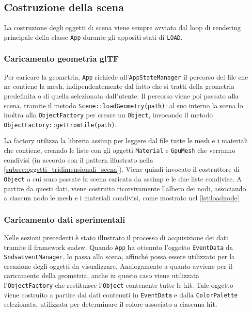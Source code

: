 \subsection{Costruzione della scena}
La costruzione degli oggetti di scena viene sempre avviata dal loop di rendering principale della classe \texttt{App} durante gli appositi stati di \texttt{LOAD}.

\subsubsection{Caricamento geometria glTF}
Per caricare la geometria, \texttt{App} richiede all'\texttt{AppStateManager} il percorso del file che ne contiene la mesh, indipendentemente dal fatto che si tratti della geometria predefinita o di quella selezionata dall'utente.
Il percorso viene poi passato alla scena, tramite il metodo \texttt{Scene::load\allowbreak{}Geometry\allowbreak{}(path)}: al suo interno la scena lo inoltra alla \texttt{ObjectFactory} per creare un \texttt{Object}, invocando il metodo \texttt{ObjectFactory::getFromFile\allowbreak{}(path)}.

La factory utilizza la libreria assimp per leggere dal file tutte le mesh e i materiali che contiene, creando le liste con gli oggetti \texttt{Material} e \texttt{GpuMesh} che verranno condivisi (in accordo con il pattern illustrato nella \cref{subsec:oggetti_tridimensionali_scena}).
Viene quindi invocato il costruttore di \texttt{Object} a cui sono passate la scena caricata da assimp e le due liste condivise. A partire da questi dati, viene costruito ricorsivamente l'albero dei nodi, associando a ciascun nodo le mesh e i materiali condivisi, come mostrato nel \cref{lst:loadnode}.



\subsubsection{Caricamento dati sperimentali}
Nelle sezioni precedenti è stato illustrato il processo di acquisizione dei dati tramite il framework sndsw.
Quando \texttt{App} ha ottenuto l'oggetto \texttt{EventData} da \texttt{SndswEventManager}, lo passa alla scena, affinché possa essere utilizzato per la creazione degli oggetti da visualizzare.
Analogamente a quanto avviene per il caricamento della geometria, anche in questo caso viene utilizzata l'\texttt{ObjectFactory} che restituisce l'\texttt{Object} contenente tutte le hit.
Tale oggetto viene costruito a partire dai dati contenuti in \texttt{EventData} e dalla \texttt{ColorPalette} selezionata, utilizzata per determinare il colore associato a ciascuna hit.

